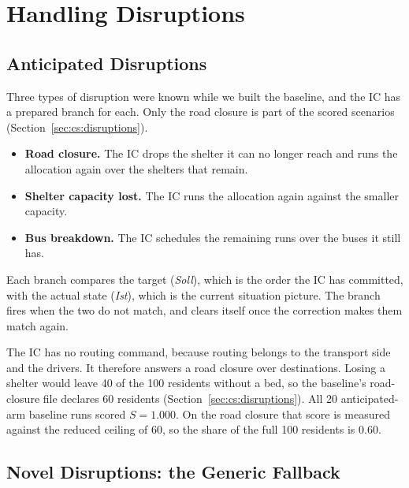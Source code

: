 \section{Handling Disruptions}
\label{sec:wf:disruptions}

\subsection{Anticipated Disruptions}

Three types of disruption were known while we built the baseline, and the IC has
a prepared branch for each. Only the road closure is part of the scored
scenarios (Section~\ref{sec:cs:disruptions}).
\begin{itemize}
  \item \textbf{Road closure.} The IC drops the shelter it can no longer reach
  and runs the allocation again over the shelters that remain.
  \item \textbf{Shelter capacity lost.} The IC runs the allocation again
  against the smaller capacity.
  \item \textbf{Bus breakdown.} The IC schedules the remaining runs over the
  buses it still has.
\end{itemize}
Each branch compares the target (\emph{Soll}), which is the order the IC has
committed, with the actual state (\emph{Ist}), which is the current situation
picture. The branch fires when the two do not match, and clears itself once
the correction makes them match again.

The IC has no routing command, because routing belongs to the transport side
and the drivers. It therefore answers a road closure over destinations. Losing a shelter
would leave 40 of the 100 residents without a bed, so the baseline's
road-closure file declares 60 residents (Section~\ref{sec:cs:disruptions}).
All 20 anticipated-arm baseline runs scored $S = 1.000$. On the road closure that score is measured against the reduced
ceiling of 60, so the share of the full 100 residents is 0.60.

\subsection{Novel Disruptions: the Generic Fallback}
\label{sec:wf:fallback}

